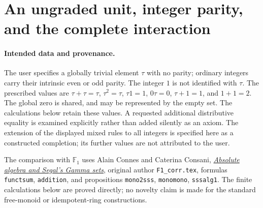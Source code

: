 \section{An ungraded unit, integer parity, and the complete interaction}
\label{sec:FMC}

\paragraph{Intended data and provenance.}
The user specifies a globally trivial element $\tau$ with no parity;
ordinary integers carry their intrinsic even or odd parity.
The integer $1$ is not identified with $\tau$.
The prescribed values are $\tau+\tau=\tau$, $\tau^2=\tau$,
$\tau1=1$, $0\tau=0$, $\tau+1=1$, and $1+1=2$.
The global zero is shared, and may be represented by the empty set.
The calculations below retain these values. A requested additional
distributive equality is examined explicitly rather than added
silently as an axiom. The extension of the displayed mixed rules
to all integers is specified here as a constructed completion;
its further values are not attributed to the user.

The comparison with $\mathbb F_1$ uses Alain Connes and Caterina
Consani, \href{https://arxiv.org/abs/1502.05585v2}{\emph{Absolute
algebra and Segal's Gamma sets}}, original author \nolinkurl{F1_corr.tex},
formulas \texttt{functsum}, \texttt{addition}, and propositions
\texttt{mono2sss}, \texttt{monomono}, \texttt{sssalg1}.
The finite calculations below are proved directly; no novelty claim
is made for the standard free-monoid or idempotent-ring constructions.

